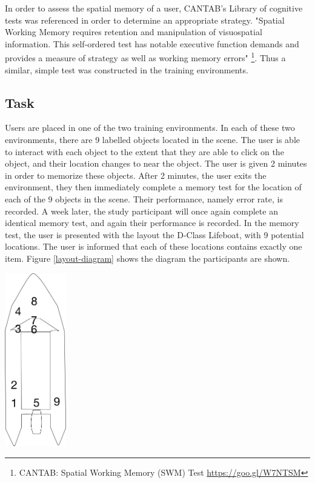 \documentclass[a4paper, openright, twoside]{book}
\begin{document}
In order to assess the spatial memory of a user, CANTAB's Library of cognitive tests was referenced in order to determine an appropriate strategy. "Spatial Working Memory requires retention and manipulation of visuospatial information. This self-ordered test has notable executive function demands and provides a measure of strategy as well as working memory errors" \footnote{ CANTAB: Spatial Working Memory (SWM) Test \url{https://goo.gl/W7NTSM}}. Thus a similar, simple test was constructed in the training environments. 

\subsection{Task}
Users are placed in one of the two training environments. In each of these two environments, there are 9 labelled objects located in the scene. The user is able to interact with each object to the extent that they are able to click on the object, and their location changes to near the object. The user is given 2 minutes in order to memorize these objects. After 2 minutes, the user exits the environment, they then immediately complete a memory test for the location of each of the 9 objects in the scene. Their performance, namely error rate, is recorded. A week later, the study participant will once again complete an identical memory test, and again their performance is recorded. In the memory test, the user is presented with the layout the D-Class Lifeboat, with 9 potential locations. The user is informed that each of these locations contains exactly one item. Figure \ref{layout-diagram} shows the diagram the participants are shown. 

\begin{minipage}{\textwidth}
\hfill \break
\centering
\includegraphics[width=0.2\textwidth]{images/ilb_simple}
\label{layout-diagram}
\hfill \break
\end{minipage}
\end{document}
